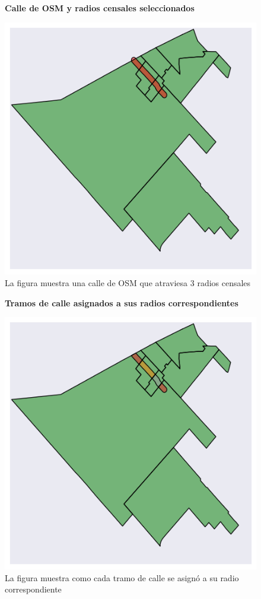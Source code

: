 \begin{figure}[!ht]
	\centering
	\textbf{Calle de OSM y radios censales seleccionados}\par\medskip
	\includegraphics[scale = 0.4]{../img/capitulo2/osm_1.png}
	\caption{La figura muestra una calle de OSM que atraviesa 3 radios censales}
\end{figure}
\begin{figure}[!hb]
	\centering
	\textbf{Tramos de calle asignados a sus radios correspondientes}\par\medskip
	\includegraphics[scale = 0.4]{../img/capitulo2/osm_2.png}
	\caption{La figura muestra como cada tramo de calle se asignó a su radio correspondiente}
\end{figure}
